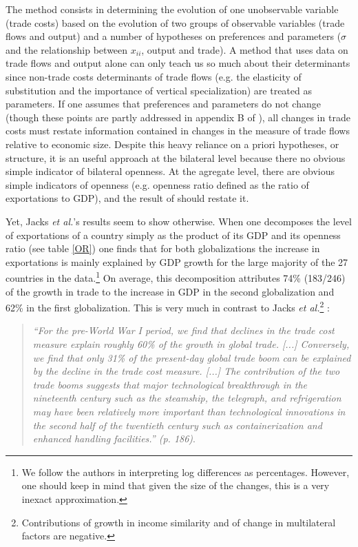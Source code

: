 \documentclass{article}
\begin{document}
The method consists in determining the evolution of one unobservable variable (trade costs) based on the evolution of two groups of observable variables (trade flows and output) and a number of hypotheses on preferences and parameters ($\sigma$ and the relationship between $x_{ii}$, output and trade). A method that uses data on trade flows and output alone can only teach us so much about their determinants since non-trade costs determinants of trade flows (e.g. the elasticity of substitution and the importance of vertical specialization) are treated as parameters. If one assumes that preferences and parameters do not change (though these points are partly addressed  in appendix B of  \cite{JMN2011}), all changes in trade costs must restate information contained in changes in the measure of trade flows relative to economic size. Despite this heavy reliance on a priori hypotheses, or structure, it is an useful approach at the bilateral level because there no obvious simple indicator of bilateral openness. At the agregate level, there are obvious simple indicators of openness (e.g. openness ratio defined as the ratio of exportations to GDP), and the result of \cite{JMN2011} should restate it.

Yet, Jacks \emph{et al.}'s results seem to show otherwise. When one decomposes the level of exportations of a country simply as the product of its GDP and its openness ratio (see table \ref{OR}) one finds that for both globalizations the increase in exportations is mainly explained by GDP growth for the large majority of the 27 countries in the data.\footnote{We follow the authors in interpreting log differences as percentages. However, one should keep in mind that given the size of the changes, this is a very inexact approximation.}
On average, this decomposition attributes 74\% (183/246) of the growth in trade to the increase in GDP in the second globalization and 62\% in the first globalization.
This is very much in contrast to  Jacks \textit{et al.}\footnote{Contributions of growth in income similarity and of change in multilateral factors are negative.} :
 
\begin{quote}
\emph{``For the pre-World War I period, we find that declines in the trade cost measure explain roughly 60\% of the growth in global trade. [...] Conversely, we find that only 31\% of the present-day global trade boom can be explained by the decline in the trade cost measure. [...] The contribution of the two trade booms suggests that major technological breakthrough in the nineteenth century such as the steamship, the telegraph, and refrigeration may have been relatively more important than technological innovations in the second half of the twentieth century such as containerization and enhanced handling facilities.'' (p. 186)}.
\end{quote}
\end{document}
